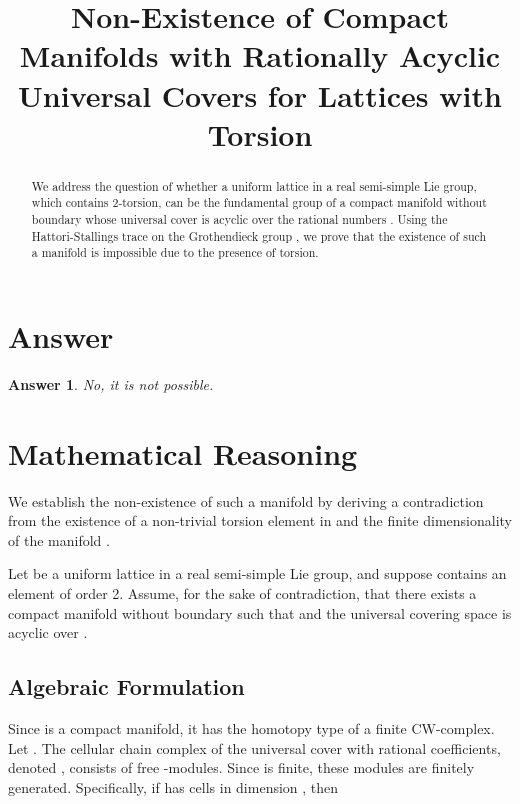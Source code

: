 \documentclass{article}
\theoremstyle{plain}
\newtheorem*{answer}{Answer}
\begin{document}
\title{Non-Existence of Compact Manifolds with Rationally Acyclic Universal Covers for Lattices with Torsion}
\author{}
\date{}
\maketitle

\begin{abstract}
We address the question of whether a uniform lattice  in a real semi-simple Lie group, which contains 2-torsion, can be the fundamental group of a compact manifold without boundary whose universal cover is acyclic over the rational numbers . Using the Hattori-Stallings trace on the Grothendieck group , we prove that the existence of such a manifold is impossible due to the presence of torsion.
\end{abstract}

\section{Answer}

\begin{answer}
No, it is not possible.
\end{answer}

\section{Mathematical Reasoning}

We establish the non-existence of such a manifold by deriving a contradiction from the existence of a non-trivial torsion element in  and the finite dimensionality of the manifold .

Let  be a uniform lattice in a real semi-simple Lie group, and suppose  contains an element  of order 2. Assume, for the sake of contradiction, that there exists a compact manifold  without boundary such that  and the universal covering space  is acyclic over .

\subsection{Algebraic Formulation}

Since  is a compact manifold, it has the homotopy type of a finite CW-complex. Let . The cellular chain complex of the universal cover with rational coefficients, denoted , consists of free -modules. Since  is finite, these modules are finitely generated. Specifically, if  has  cells in dimension , then
\end{document}
